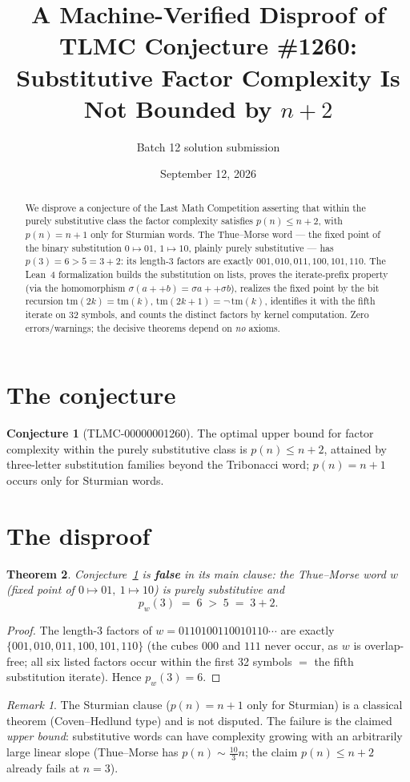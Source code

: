 \documentclass[11pt]{article}
\title{A Machine-Verified Disproof of TLMC Conjecture \#1260:\\ Substitutive Factor Complexity Is Not Bounded by $n+2$}
\author{Batch 12 solution submission}
\date{September 12, 2026}
\newtheorem{theorem}{Theorem}[section]
\theoremstyle{definition}
\newtheorem{conjecture}[theorem]{Conjecture}
\theoremstyle{remark}
\newtheorem*{remark}{Remark}
\begin{document}
\maketitle
\begin{abstract}
We disprove a conjecture of the Last Math Competition asserting that within the purely substitutive class the factor complexity satisfies $p(n) \le n + 2$, with $p(n) = n+1$ only for Sturmian words. The Thue--Morse word --- the fixed point of the binary substitution $0 \mapsto 01$, $1 \mapsto 10$, plainly purely substitutive --- has $p(3) = 6 > 5 = 3+2$: its length-3 factors are exactly $001, 010, 011, 100, 101, 110$. The Lean~4 formalization builds the substitution on lists, proves the iterate-prefix property (via the homomorphism $\sigma(a{+}{+}b) = \sigma a {+}{+} \sigma b$), realizes the fixed point by the bit recursion $\mathrm{tm}(2k) = \mathrm{tm}(k)$, $\mathrm{tm}(2k{+}1) = \neg\,\mathrm{tm}(k)$, identifies it with the fifth iterate on 32 symbols, and counts the distinct factors by kernel computation. Zero errors/warnings; the decisive theorems depend on \emph{no} axioms.
\end{abstract}
\section{The conjecture}
\begin{conjecture}[TLMC-00000001260]\label{conj:1260}
The optimal upper bound for factor complexity within the purely substitutive class is $p(n) \le n+2$, attained by three-letter substitution families beyond the Tribonacci word; $p(n) = n+1$ occurs only for Sturmian words.
\end{conjecture}
\section{The disproof}
\begin{theorem}\label{thm:1260}
Conjecture~\ref{conj:1260} is \textbf{false} in its main clause: the Thue--Morse word $w$ (fixed point of $0\mapsto 01,\ 1\mapsto 10$) is purely substitutive and
\[
p_w(3) \;=\; 6 \;>\; 5 \;=\; 3 + 2.
\]
\end{theorem}
\begin{proof}
The length-3 factors of $w = 0110100110010110\cdots$ are exactly $\{001, 010, 011, 100, 101, 110\}$ (the cubes $000$ and $111$ never occur, as $w$ is overlap-free; all six listed factors occur within the first 32 symbols $=$ the fifth substitution iterate). Hence $p_w(3) = 6$.
\end{proof}
\begin{remark}
The Sturmian clause ($p(n) = n+1$ only for Sturmian) is a classical theorem (Coven--Hedlund type) and is not disputed. The failure is the claimed \emph{upper bound}: substitutive words can have complexity growing with an arbitrarily large linear slope (Thue--Morse has $p(n) \sim \frac{10}{3}n$; the claim $p(n) \le n+2$ already fails at $n = 3$).
\end{remark}
\end{document}
